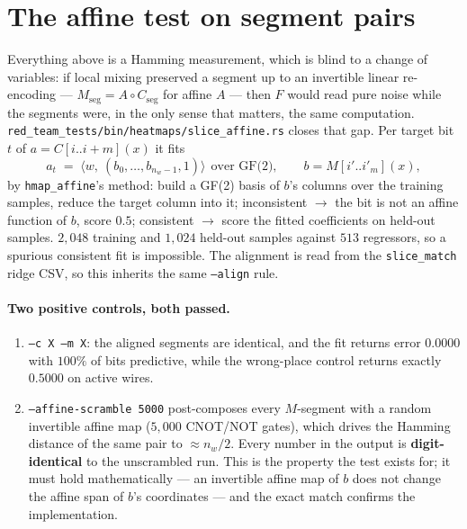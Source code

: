 \documentclass[11pt]{article}
\newcommand{\code}[1]{\texttt{#1}}
\begin{document}
\section{The affine test on segment pairs}

Everything above is a Hamming measurement, which is blind to a change of variables: if local mixing
preserved a segment up to an invertible linear re-encoding --- $M_{\mathrm{seg}} = A\circ
C_{\mathrm{seg}}$ for affine $A$ --- then $F$ would read pure noise while the segments were, in the only
sense that matters, the same computation. \code{red\_team\_tests/bin/heatmaps/slice\_affine.rs} closes
that gap. Per target bit $t$ of $a=C[i..i{+}m](x)$ it fits
\[
a_t \;=\; \langle w,\ (b_0,\dots,b_{n_w-1},1)\rangle \ \ \text{over GF(2)},
\qquad b = M[i'..i'_m](x),
\]
by \code{hmap\_affine}'s method: build a GF(2) basis of $b$'s columns over the training samples, reduce
the target column into it; inconsistent $\to$ the bit is not an affine function of $b$, score $0.5$;
consistent $\to$ score the fitted coefficients on held-out samples. $2{,}048$ training and $1{,}024$
held-out samples against $513$ regressors, so a spurious consistent fit is impossible. The alignment is
read from the \code{slice\_match} ridge CSV, so this inherits the same \code{--align} rule.

\paragraph{Two positive controls, both passed.}
\begin{enumerate}
\item \code{--c X --m X}: the aligned segments are identical, and the fit returns error
$\mathbf{0.0000}$ with $100\%$ of bits predictive, while the wrong-place control returns exactly
$\mathbf{0.5000}$ on active wires.
\item \code{--affine-scramble 5000} post-composes every $M$-segment with a random invertible affine map
($5{,}000$ CNOT/NOT gates), which drives the Hamming distance of the same pair to $\approx n_w/2$. Every
number in the output is \textbf{digit-identical} to the unscrambled run. This is the property the test
exists for; it must hold mathematically --- an invertible affine map of $b$ does not change the affine
span of $b$'s coordinates --- and the exact match confirms the implementation.
\end{enumerate}
\end{document}

